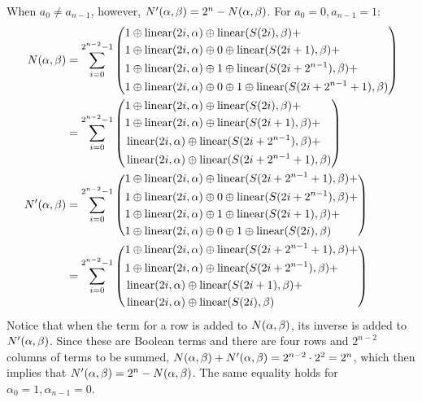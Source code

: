 When $a_0 \neq a_{n-1}$, however, $N'(\alpha,\beta) = 2^n - N(\alpha,\beta)$. For $a_0 = 0, a_{n-1} = 1$:
\begin{align*}
    N(\alpha,\beta) &= 
    \sum_{i=0}^{2^{n-2}-1} \left(
\begin{aligned}
    &1 \oplus \operatorname{linear}(2i,\alpha) \oplus \operatorname{linear}(S(2i),\beta) + \\
    &1 \oplus \operatorname{linear}(2i,\alpha) \oplus 0 \oplus \operatorname{linear}(S(2i + 1),\beta) + \\
    &1 \oplus \operatorname{linear}(2i,\alpha) \oplus 1 \oplus \operatorname{linear}(S(2i + 2^{n-1}),\beta) + \\
    &1 \oplus \operatorname{linear}(2i,\alpha) \oplus 0 \oplus 1 \oplus \operatorname{linear}(S(2i + 2^{n-1} + 1),\beta)
\end{aligned}
    \right) \\
    &=
    \sum_{i=0}^{2^{n-2}-1} \left(
\begin{aligned}
    &1 \oplus \operatorname{linear}(2i,\alpha) \oplus \operatorname{linear}(S(2i),\beta) + \\
    &1 \oplus \operatorname{linear}(2i,\alpha) \oplus \operatorname{linear}(S(2i + 1),\beta) + \\
    &\operatorname{linear}(2i,\alpha) \oplus \operatorname{linear}(S(2i + 2^{n-1}),\beta) + \\
    &\operatorname{linear}(2i,\alpha) \oplus \operatorname{linear}(S(2i + 2^{n-1} + 1),\beta)
\end{aligned}
    \right) \\
    N'(\alpha,\beta) &= 
    \sum_{i=0}^{2^{n-2}-1} \left(
\begin{aligned}
    &1 \oplus \operatorname{linear}(2i,\alpha) \oplus \operatorname{linear}(S(2i + 2^{n-1} + 1),\beta) + \\
    &1 \oplus \operatorname{linear}(2i,\alpha) \oplus 0 \oplus \operatorname{linear}(S(2i + 2^{n-1}),\beta) + \\
    &1 \oplus \operatorname{linear}(2i,\alpha) \oplus 1 \oplus \operatorname{linear}(S(2i + 1),\beta) + \\
    &1 \oplus \operatorname{linear}(2i,\alpha) \oplus 0 \oplus 1 \oplus \operatorname{linear}(S(2i),\beta)
\end{aligned}
    \right) \\
    &=
    \sum_{i=0}^{2^{n-2}-1} \left(
\begin{aligned}
    &1 \oplus \operatorname{linear}(2i,\alpha) \oplus \operatorname{linear}(S(2i + 2^{n-1} + 1),\beta) + \\
    &1 \oplus \operatorname{linear}(2i,\alpha) \oplus \operatorname{linear}(S(2i + 2^{n-1}),\beta) + \\
    &\operatorname{linear}(2i,\alpha) \oplus \operatorname{linear}(S(2i + 1),\beta) + \\
    &\operatorname{linear}(2i,\alpha) \oplus \operatorname{linear}(S(2i),\beta)
\end{aligned}
    \right)
\end{align*}
Notice that when the term for a row is added to $N(\alpha,\beta)$, its inverse is added to $N'(\alpha,\beta)$. 
Since these are Boolean terms and there are four rows and $2^{n-2}$ columns of terms to be summed,
$N(\alpha,\beta) + N'(\alpha,\beta) = 2^{n-2} \cdot 2^2 = 2^n$, which then implies that
$N'(\alpha,\beta) = 2^n - N(\alpha,\beta)$.
The same equality holds for $\alpha_0 = 1, \alpha_{n-1} = 0$. 

